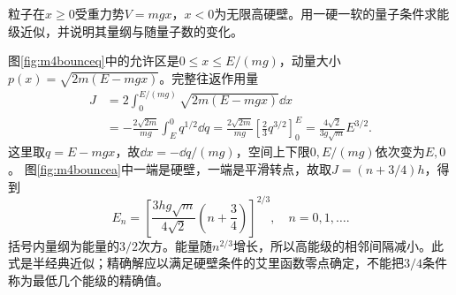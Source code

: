 \begin{example}\label{ex:m4bounce}
粒子在$x\geq0$受重力势$V=mgx$，$x<0$为无限高硬壁。用一硬一软的量子条件求能级近似，并说明其量纲与随量子数的变化。
\end{example}
\begin{solution}
图\ref{fig:m4bounceq}中的允许区是$0\leq x\leq E/(mg)$，动量大小$p(x)=\sqrt{2m(E-mgx)}$。完整往返作用量
\begin{align*}
 J&=2\int_0^{E/(mg)}\sqrt{2m(E-mgx)}\dd x\\
 &=-\frac{2\sqrt{2m}}{mg}\int_E^0 q^{1/2}\dd q
 =\frac{2\sqrt{2m}}{mg}\left[\frac23q^{3/2}\right]_0^E
 =\frac{4\sqrt2}{3g\sqrt m}E^{3/2}.
\end{align*}
这里取$q=E-mgx$，故$\dd x=-\dd q/(mg)$，空间上下限$0,E/(mg)$依次变为$E,0$。
图\ref{fig:m4bouncea}中一端是硬壁，一端是平滑转点，故取$J=(n+3/4)h$，得到
\[
 E_n=\left[\frac{3hg\sqrt m}{4\sqrt2}\left(n+\frac34\right)\right]^{2/3},\quad n=0,1,\ldots.
\]
括号内量纲为能量的$3/2$次方。能量随$n^{2/3}$增长，所以高能级的相邻间隔减小。此式是半经典近似；精确解应以满足硬壁条件的艾里函数零点确定，不能把$3/4$条件称为最低几个能级的精确值。
\end{solution}





